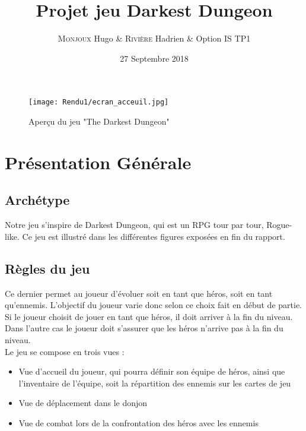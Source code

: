 \documentclass[a4paper,12pt]{article}
\title{Projet jeu Darkest Dungeon}
\author{\textsc{Monjoux} Hugo & \textsc{Rivière} Hadrien & Option IS TP1}
\date{27 Septembre 2018}
\begin{document}
\maketitle
\begin{figure}[!ht]
  \centering
  \texttt{[image: Rendu1/ecran\_acceuil.jpg]}
  \caption{Aperçu du jeu "The Darkest Dungeon"}
\end{figure}

\newpage
\tableofcontents
\newpage
\section{Présentation Générale}
\subsection{Archétype}
Notre jeu s'inspire de Darkest Dungeon, qui est un RPG tour par tour, Rogue-like. Ce jeu est illustré dans les différentes figures exposées en fin du rapport. 

\subsection{Règles du jeu}

 Ce dernier permet au joueur d'évoluer soit en tant que héros, soit en tant qu'ennemis. L'objectif du joueur varie donc selon ce choix fait en début de partie. Si le joueur choisit de jouer en tant que héros, il doit arriver à la fin du niveau. Dans l'autre cas le joueur doit s'assurer que les héros n'arrive pas à la fin du niveau. 
\\ 
\indent
Le jeu se compose en trois vues : 
\begin{itemize}
    \item Vue d'accueil du joueur, qui pourra définir son équipe de héros, ainsi que l'inventaire de l'équipe, soit la répartition des ennemis sur les cartes de jeu
    \item Vue de déplacement dans le donjon
    \item Vue de combat lors de la confrontation des héros avec les ennemis
\end{itemize} 
\end{document}
